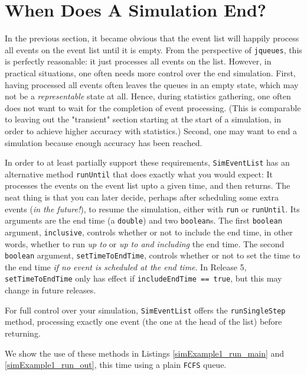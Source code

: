 \section{When Does A Simulation End?}
\label{sec:guided:simulation-end}

In the previous section,
it became obvious that
the event list will happily process
all events on the event list until it is empty.
From the perspective of \lstinline|jqueues|,
this is perfectly reasonable:
it just processes all events on the list.
However, in practical situations,
one often needs more control over the end
simulation.
First,
having processed all events often leaves the queues
in an empty state,
which may not be a {\em representable\/} state at all.
Hence, during statistics gathering, one often
does not want to wait for the completion of event
processing.
(This is comparable to leaving out the "transient"
section starting at the start of a simulation,
in order to achieve higher accuracy with statistics.)
Second, one may want to end a simulation because
enough accuracy has been reached.

In order to at least partially support these requirements,
\lstinline|SimEventList| has an alternative method
\lstinline|runUntil| that does exactly what you would expect:
It processes the events on the event list
upto a given time,
and then returns.
The neat thing is that you can later decide,
perhaps after scheduling some extra events
({\em in the future!\/}),
to resume the simulation,
either with \lstinline|run|
or \lstinline|runUntil|.
Its arguments are the end time (a \lstinline|double|)
and two \lstinline|boolean|s.
The first \lstinline|boolean| argument,
\lstinline|inclusive|,
controls whether or not to include
the end time,
in other words,
whether to run {\em up to\/}
or {\em up to and including\/}
the end time.
The second \lstinline|boolean| argument,
\lstinline|setTimeToEndTime|,
controls whether or not to set the
time to the end time
{\em if no event is scheduled at the end time}.
In Release 5,
\lstinline|setTimeToEndTime| only has effect
if
\lstinline|includeEndTime == true|,
but this may change in future releases.

For full control over your simulation,
\lstinline|SimEventList| offers
the \lstinline|runSingleStep|
method, processing
exactly one event
(the one at the head of the list)
before returning.

We show the use of these methods in Listings
\ref{simExample1_run_main} and \ref{simExample1_run_out},
this time using a plain \lstinline|FCFS| queue.

